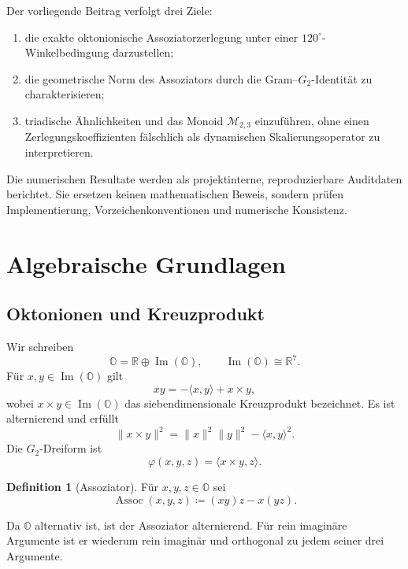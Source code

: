 \documentclass[11pt,a4paper]{article}
\theoremstyle{definition}
\newtheorem{definition}[theorem]{Definition}
\newcommand{\Oalg}{\mathbb O}
\newcommand{\ImO}{\operatorname{Im}(\mathbb O)}
\newcommand{\Assoc}{\operatorname{Assoc}}
\newcommand{\MtwoThree}{\mathcal M_{2,3}}
\newcommand{\R}{\mathbb R}
\begin{document}
Der vorliegende Beitrag verfolgt drei Ziele:
\begin{enumerate}
  \item die exakte oktonionische Assoziatorzerlegung unter einer $120^\circ$-Winkelbedingung darzustellen;
  \item die geometrische Norm des Assoziators durch die Gram--$G_2$-Identität zu charakterisieren;
  \item triadische Ähnlichkeiten und das Monoid $\MtwoThree$ einzuführen, ohne einen Zerlegungskoeffizienten fälschlich als dynamischen Skalierungsoperator zu interpretieren.
\end{enumerate}

Die numerischen Resultate werden als projektinterne, reproduzierbare Auditdaten berichtet. Sie ersetzen keinen mathematischen Beweis, sondern prüfen Implementierung, Vorzeichenkonventionen und numerische Konsistenz.

\section{Algebraische Grundlagen}

\subsection{Oktonionen und Kreuzprodukt}

Wir schreiben
\[
\Oalg=\R\oplus\ImO,
\qquad
\ImO\cong\R^7.
\]
Für $x,y\in\ImO$ gilt
\begin{equation}
xy=-\langle x,y\rangle+x\times y,
\label{eq:imag-product}
\end{equation}
wobei $x\times y\in\ImO$ das siebendimensionale Kreuzprodukt bezeichnet. Es ist alternierend und erfüllt
\[
\|x\times y\|^2
=
\|x\|^2\|y\|^2-\langle x,y\rangle^2.
\]
Die $G_2$-Dreiform ist
\begin{equation}
\varphi(x,y,z)
=
\langle x\times y,z\rangle.
\label{eq:g2-form}
\end{equation}

\begin{definition}[Assoziator]
Für $x,y,z\in\Oalg$ sei
\begin{equation}
\Assoc(x,y,z)
\coloneqq
(xy)z-x(yz).
\end{equation}
\end{definition}

Da $\Oalg$ alternativ ist, ist der Assoziator alternierend. Für rein imaginäre Argumente ist er wiederum rein imaginär und orthogonal zu jedem seiner drei Argumente.
\end{document}
